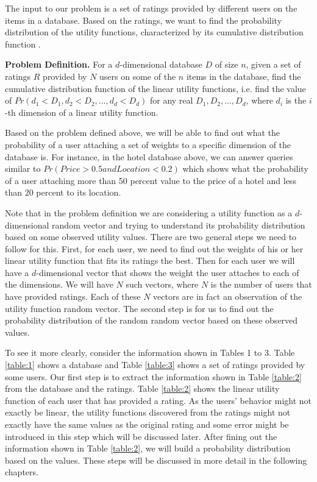 The input to our problem is a set of ratings provided by different users on the items in a database. Based on the ratings, we want to find the probability distribution of the utility functions, characterized by its cumulative distribution function .

\medskip
\indent \textbf{Problem Definition.}  For a $d$-dimensional database $D$ of size $n$, given a set of ratings $R$ provided by $N$ users on some of the $n$ items in the database, find the cumulative distribution function of the linear utility functions, i.e. find the value of $Pr(d_1 < D_1, d_2 < D_2, ..., d_d < D_d )$ for any real $D_1, D_2, ..., D_d$, where $d_i$ is the $i$-th dimension of a linear utility function.
\medskip

Based on the problem defined above, we will be able to find out what the probability of a user attaching a set of weights to a specific dimension of the database is. For instance, in the hotel database above, we can answer queries similar to $Pr(Price > 0.5 and Location < 0.2)$ which shows what the probability of a user attaching more than 50 percent value to the price of a hotel and less than 20 percent to its location.

Note that in the problem definition we are considering a utility function as a $d$-dimensional random vector and trying to understand its probability distribution based on some observed utility values. There are two general steps we need to follow for this. First, for each user, we need to find out the weights of his or her linear utility function that fits its ratings the best. Then for each user we will have a $d$-dimensional vector that shows the weight the user attaches to each of the dimensions. We will have $N$ such vectors, where $N$ is the number of users that have provided ratings. Each of these $N$ vectors are in fact an observation of the utility function random vector. The second step is for us to find out the probability distribution of the random random vector based on these observed values.

To see it more clearly, consider the information shown in Tables 1 to 3. Table \ref{table:1} shows a database and Table \ref{table:3} shows a set of ratings provided by some users. Our first step is to extract the information shown in Table \ref{table:2} from the database and the ratings. Table \ref{table:2} shows the linear utility function of each user that has provided a rating. As the users' behavior might not exactly be linear, the utility functions discovered from the ratings might not exactly have the same values as the original rating and some error might be introduced in this step which will be discussed later. After fining out the information shown in Table \ref{table:2}, we will build a probability distribution based on the values.  These steps will be discussed in more detail in the following chapters.

 



